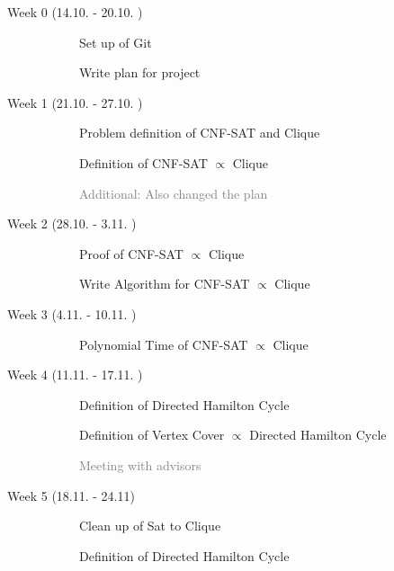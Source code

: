 \documentclass[11pt,a4paper]{scrartcl}
\begin{document}
	\begin{description}
		\item[Week 0 (14.10. - 20.10. )] \hfill
		\begin{description}
			\item[\textcolor{Green}{\CheckedBox}] Set up of Git
			\item[\textcolor{Green}{\CheckedBox}] Write plan for project 
		\end{description}
		\item[ Week 1 (21.10. - 27.10. )] \hfill 
		\begin{description}
			\item[\textcolor{Green}{\CheckedBox}] Problem definition of CNF-SAT and Clique
			\item[\textcolor{Green}{\CheckedBox}] Definition of CNF-SAT $\varpropto$ Clique
			\item[] \textcolor{gray}{Additional: Also changed the plan}
		\end{description}
		\item[Week 2 (28.10. - 3.11. )] \hfill
		\begin{description}
			\item[\textcolor{Green}{\CheckedBox}]Proof of CNF-SAT $\varpropto$ Clique
			\item[\textcolor{Green}{\CheckedBox}] Write Algorithm for CNF-SAT $\varpropto$ Clique
			\end{description}
		\item[Week 3 (4.11. - 10.11. )]\hfill \begin{description}
			\item[\textcolor{Green}{\CheckedBox}] Polynomial Time of CNF-SAT $\varpropto$ Clique
		\end{description} 
		\item[Week 4 (11.11. - 17.11. )] \hfill
		\begin{description}
			\item[\textcolor{Red}{\XBox}] Definition of  Directed Hamilton Cycle
			\item[\textcolor{Red}{\XBox}] Definition of Vertex Cover $\varpropto$ Directed Hamilton Cycle
			\item[] \textcolor{gray}{Meeting with advisors}
		\end{description} 
		\item[Week 5 (18.11. - 24.11)] \hfill		
		\begin{description}
			\item[\textcolor{Green}{\CheckedBox}] Clean up of Sat to Clique
			\item[\textcolor{Green}{\CheckedBox}] Definition of  Directed Hamilton Cycle

\end{description}
\end{description}
\end{document}
